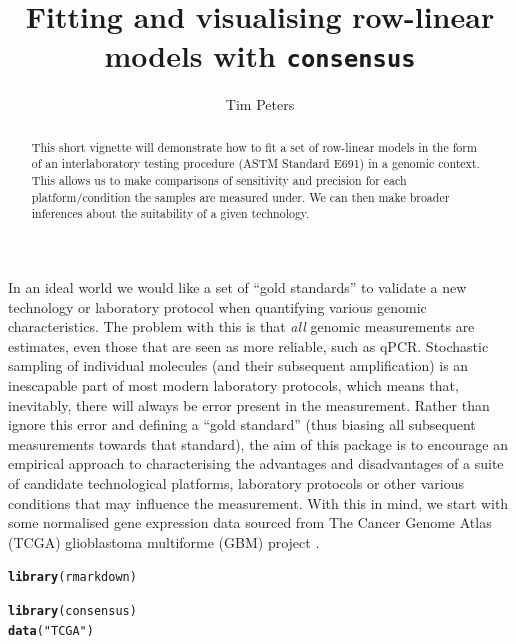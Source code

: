 \documentclass{article}\usepackage[]{graphicx}\usepackage[]{color}
\makeatletter
\newcommand{\hlstr}[1]{\textcolor[rgb]{0.192,0.494,0.8}{#1}}%
\newcommand{\hlstd}[1]{\textcolor[rgb]{0.345,0.345,0.345}{#1}}%
\newcommand{\hlkwd}[1]{\textcolor[rgb]{0.737,0.353,0.396}{\textbf{#1}}}%
\newenvironment{kframe}{%
 \def\at@end@of@kframe{}%
 \ifinner\ifhmode%
  \def\at@end@of@kframe{\end{minipage}}%
  \begin{minipage}{\columnwidth}%
 \fi\fi%
 \def\FrameCommand##1{\hskip\@totalleftmargin \hskip-\fboxsep
 \colorbox{shadecolor}{##1}\hskip-\fboxsep
     \hskip-\linewidth \hskip-\@totalleftmargin \hskip\columnwidth}%
 \MakeFramed {\advance\hsize-\width
   \@totalleftmargin\z@ \linewidth\hsize
   \@setminipage}}%
 {\par\unskip\endMakeFramed%
 \at@end@of@kframe}
\newenvironment{knitrout}{}{} %
\makeatother
\begin{document}
\title{Fitting and visualising row-linear models with \texttt{consensus}}

\author{Tim Peters}
\maketitle

\renewcommand{\abstractname}{Summary}
\begin{abstract}
This short vignette will demonstrate how to fit a set of row-linear models in the form of an interlaboratory testing procedure (ASTM Standard E691) in a genomic context. This allows us to make comparisons of sensitivity and precision for each platform/condition the samples are measured under. We can then make broader inferences about the suitability of a given technology. 
\end{abstract}

In an ideal world we would like a set of ``gold standards'' to validate a new technology or laboratory protocol when quantifying various genomic characteristics. The problem with this is that \emph{all} genomic measurements are estimates, even those that are seen as more reliable, such as qPCR. Stochastic sampling of individual molecules (and their subsequent amplification) is an inescapable part of most modern laboratory protocols, which means that, inevitably, there will always be error present in the measurement. Rather than ignore this error and defining a ``gold standard'' (thus biasing all subsequent measurements towards that standard), the aim of this package is to encourage an empirical approach to characterising the advantages and disadvantages of a suite of candidate technological platforms, laboratory protocols or other various conditions that may influence the measurement. With this in mind, we start with some normalised gene expression data sourced from The Cancer Genome Atlas (TCGA) glioblastoma multiforme (GBM) project \cite{Verhaak}.

\begin{knitrout}
\color{fgcolor}\begin{kframe}
\begin{alltt}
\hlkwd{library}\hlstd{(rmarkdown)}
\end{alltt}
\end{kframe}
\end{knitrout}

\begin{knitrout}
\color{fgcolor}\begin{kframe}
\begin{alltt}
\hlkwd{library}\hlstd{(consensus)}
\hlkwd{data}\hlstd{(}\hlstr{"TCGA"}\hlstd{)}
\end{alltt}
\end{kframe}
\end{knitrout}
\end{document}
